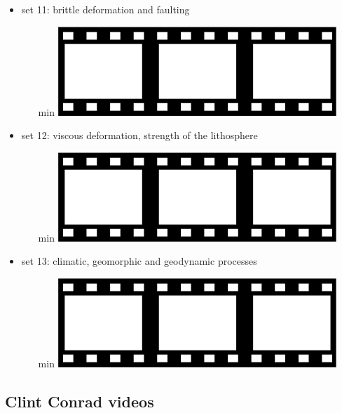 \begin{itemize}
\item set 11: brittle deformation and faulting
\begin{enumerate}
\item [min] \href{}{\includegraphics[width=.8cm]{images/pictograms/film.png}}
\end{enumerate}

\item set 12: viscous deformation, strength of the lithosphere
\begin{enumerate}
\item [min] \href{}{\includegraphics[width=.8cm]{images/pictograms/film.png}}
\end{enumerate}

\item set 13: climatic, geomorphic and geodynamic processes
\begin{enumerate}
\item [min] \href{}{\includegraphics[width=.8cm]{images/pictograms/film.png}}
\end{enumerate}

\end{itemize}

\subsection{Clint Conrad videos}

